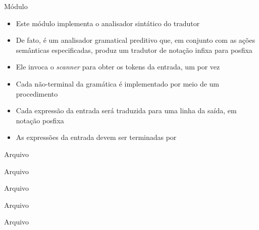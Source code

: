\begin{frame}[fragile]{Módulo }

    \begin{itemize}
        \item Este módulo implementa o analisador sintático do tradutor

        \item De fato, é um analisador gramatical preditivo que, em conjunto com as ações semânticas especificadas, produz um tradutor de notação infixa para
            posfixa

        \item Ele invoca o \textit{scanner} para obter os tokens da entrada, um por vez

        \item Cada não-terminal da gramática é implementado por meio de um procedimento

        \item Cada expressão da entrada será traduzida para uma linha da saída, em notação posfixa

        \item As expressões da entrada devem ser terminadas por 
    \end{itemize}

\end{frame}

\begin{frame}[fragile]{Arquivo }
\end{frame}

\begin{frame}[fragile]{Arquivo }
\end{frame}

\begin{frame}[fragile]{Arquivo }
\end{frame}

\begin{frame}[fragile]{Arquivo }
\end{frame}

\begin{frame}[fragile]{Arquivo }
\end{frame}

